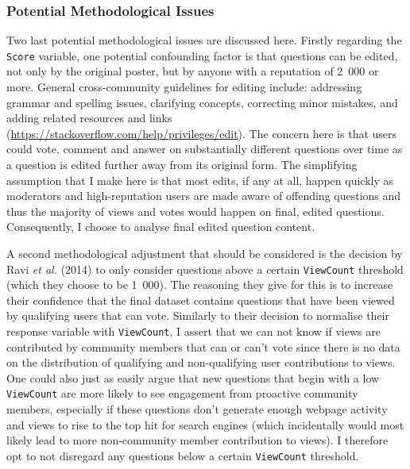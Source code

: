 \documentclass[11pt,preprint, authoryear]{article}
\begin{document}
\normalsize

\subsubsection{\texorpdfstring{Potential Methodological Issues
\label{Issues}}{Potential Methodological Issues }}\label{potential-methodological-issues}

Two last potential methodological issues are discussed here. Firstly
regarding the \texttt{Score} variable, one potential confounding factor
is that questions can be edited, not only by the original poster, but by
anyone with a reputation of 2~000 or more. General cross-community
guidelines for editing include: addressing grammar and spelling issues,
clarifying concepts, correcting minor mistakes, and adding related
resources and links
(\url{https://stackoverflow.com/help/privileges/edit}). The concern here
is that users could vote, comment and answer on substantially different
questions over time as a question is edited further away from its
original form. The simplifying assumption that I make here is that most
edits, if any at all, happen quickly as moderators and high-reputation
users are made aware of offending questions and thus the majority of
views and votes would happen on final, edited questions. Consequently, I
choose to analyse final edited question content.

A second methodological adjustment that should be considered is the
decision by Ravi \emph{et al.} (2014) to only consider questions above a
certain \texttt{ViewCount} threshold (which they choose to be 1~000).
The reasoning they give for this is to increase their confidence that
the final dataset contains questions that have been viewed by qualifying
users that can vote. Similarly to their decision to normalise their
response variable with \texttt{ViewCount}, I assert that we can not know
if views are contributed by community members that can or can't vote
since there is no data on the distribution of qualifying and
non-qualifying user contributions to views. One could also just as
easily argue that new questions that begin with a low \texttt{ViewCount}
are more likely to see engagement from proactive community members,
especially if these questions don't generate enough webpage activity and
views to rise to the top hit for search engines (which incidentally
would most likely lead to more non-community member contribution to
views). I therefore opt to not disregard any questions below a certain
\texttt{ViewCount} threshold.
\end{document}
